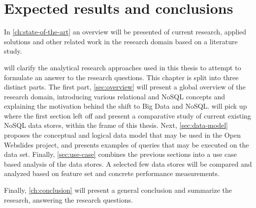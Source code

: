 \section{Expected results and conclusions}
\label{sec:expected-results-and-conclusions}


\clearpage{}

In \cref{ch:state-of-the-art} an overview will be presented of current research, applied solutions and other related work in the research domain based on a literature study.

 will clarify the analytical research approaches used in this thesis to attempt to formulate an answer to the research questions. This chapter is split into three distinct parts. The first part, \cref{sec:overview} will present a global overview of the research domain, introducing various relational and NoSQL concepts and explaining the motivation behind the shift to Big Data and NoSQL.
 will pick up where the first section left off and present a comparative study of current existing NoSQL data stores, within the frame of this thesis. Next, \cref{sec:data-model} proposes the conceptual and logical data model that may be used in the Open Webslides project, and presents examples of queries that may be executed on the data set.
Finally, \cref{sec:use-case} combines the previous sections into a use case based analysis of the data stores. A selected few data stores will be compared and analyzed based on feature set and concrete performance measurements.

Finally, \cref{ch:conclusion} will present a general conclusion and summarize the research, answering the research questions.
